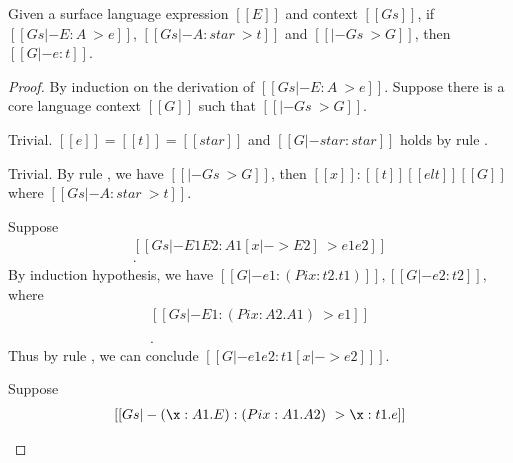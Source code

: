 \begin{thm}
Given a surface language expression $[[E]]$ and context $[[Gs]]$, 
if $[[Gs |- E:A ~> e]]$, $[[Gs |- A:star ~> t]]$ and $[[|- Gs ~> G]]$, then
$[[G |- e:t]]$.
\end{thm}

\begin{proof}
    By induction on the derivation of $[[Gs |- E : A ~> e]]$. Suppose there is
a core language context $[[G]]$ such that $[[|- Gs ~> G]]$.
    \begin{description}
        \renewcommand{\hlmath}[1]{#1}
        \item[Case $\ottdruleTRXXAx{}$:] $\quad$ \\ Trivial. $[[e]] = [[t]] = [[star]]$ and
$[[G |- star:star]]$ holds by rule .
        \item[Case $\ottdruleTRXXVar{}$:] $\quad$ \\ Trivial. By rule , we
have $[[|- Gs ~> G]]$, then $[[x]]:[[t]] [[elt]] [[G]]$ where $[[Gs |-
A:star~>t]]$.
        \item[Case \resizebox{.9\columnwidth}{!}{$\ottdruleTRXXApp{}$}:] $\quad$ \\ Suppose
            \[\begin{array}{l}
            [[Gs |- E1 E2 : A1[x |-> E2] ~> e1 e2]] \\
            [[Gs |- A1[x |-> E2] : star ~> t1 [x |-> e2] ]].
            \end{array} \]
            By induction
            hypothesis, we have 
            $
            [[G |- e1 : (Pi x:t2.t1)]],
            [[G |- e2:t2]],
            $
            where
            \[\begin{array}{l}
             [[Gs |- E1 : (Pi x:A2.A1) ~> e1]] \\
              [[Gs |- (Pi x:A2.A1) : star ~> (Pi x:t2.t1)]] \\
              [[Gs |- E2 : A2 ~> e2]] \\
              [[Gs |- A2 : star ~> t2]].
            \end{array}\] Thus by rule , we can conclude $[[G |- e1 e2 : t1 [x |-> e2] ]]$.
        \item[Case $\ottdruleTRXXLam{}$:] $\quad$ \\ Suppose
            \[\begin{array}{l}
            [[Gs |- (\x:A1.E):(Pi x:A1.A2) ~> \x:t1.e]] \\ 

\end{array}\]
\end{description}
\end{proof}
